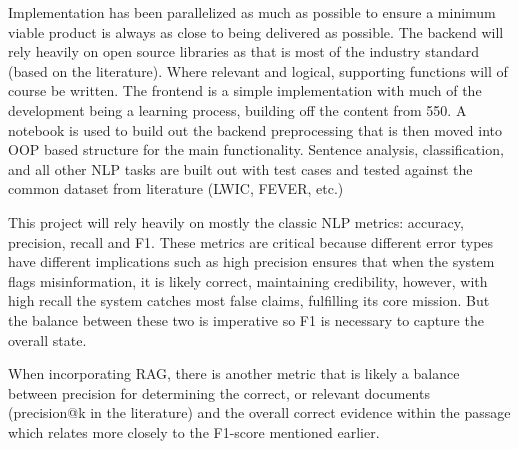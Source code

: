 \documentclass[11pt,letterpaper]{article}
\begin{document}
{

Implementation has been parallelized as much as possible to ensure a minimum viable product is always as close to being delivered as possible. The backend will rely heavily on open source libraries as that is most of the industry standard (based on the literature). Where relevant and logical, supporting functions will of course be written. The frontend is a simple implementation with much of the development being a learning process, building off the content from 550. A notebook is used to build out the backend preprocessing that is then moved into OOP based structure for the main functionality. Sentence analysis, classification, and all other NLP tasks are built out with test cases and tested against the common dataset from literature (LWIC, FEVER, etc.)
}
{


This project will rely heavily on mostly the classic NLP metrics: accuracy, precision, recall and F1. These metrics are critical because different error types have different implications such as high precision ensures that when the system flags misinformation, it is likely correct, maintaining credibility, however, with high recall the system catches most false claims, fulfilling its core mission. But the balance between these two is imperative so F1 is necessary to capture the overall state.

When incorporating RAG, there is another metric that is likely a balance between precision for determining the correct, or relevant documents (precision@k in the literature) and the overall correct evidence within the passage which relates more closely to the F1-score mentioned earlier. 

}
\end{document}
